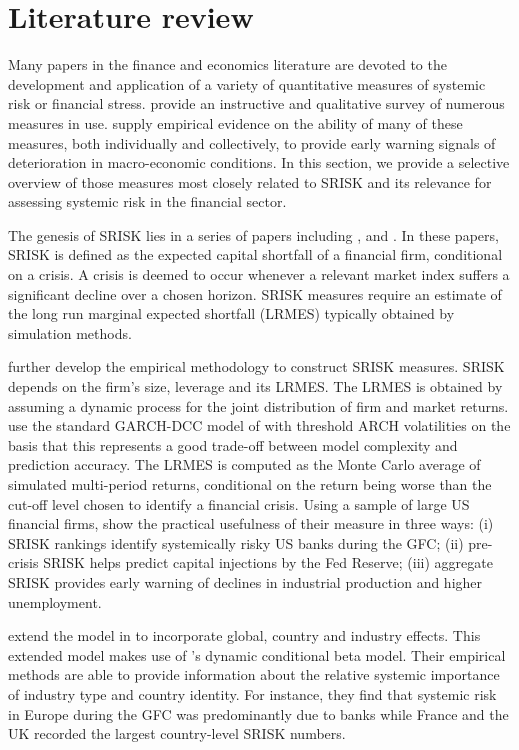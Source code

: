 \documentclass[12pt]{article}
\begin{document}
\section{Literature review}\label{litrev}
Many papers in the finance and economics literature are devoted to the development and application of a variety of quantitative measures of systemic risk or financial stress. \cite{Bisias2012} provide an instructive and qualitative survey of numerous measures in use. \cite{Giglio2015} supply empirical evidence on the ability of many of these measures, both individually and collectively, to provide early warning signals of deterioration in macro-economic conditions. In this section, we provide a selective overview of those measures most closely related to SRISK and its relevance for assessing systemic risk in the financial sector. 

The genesis of SRISK lies in a series of papers including \cite{acharya2012aer}, \cite{acharya2012wp} and \cite{brownlees2010volatility}. In these papers, SRISK is defined as the expected capital shortfall of a financial firm, conditional on a crisis. A crisis is deemed to occur whenever a relevant market index suffers a significant decline over a chosen horizon. SRISK measures require an estimate of the long run marginal expected shortfall (LRMES) typically obtained by simulation methods.

\cite{brownlees2015} further develop the empirical methodology to construct SRISK measures. SRISK depends on the firm's size, leverage and its LRMES. The LRMES is obtained by assuming a dynamic process for the joint distribution of firm and market returns. \cite{brownlees2015} use  the standard GARCH-DCC model of \cite{engle2002dynamic} with threshold ARCH volatilities on the basis that this represents a good trade-off between model complexity and prediction accuracy. The LRMES is computed as the Monte Carlo average of simulated multi-period returns,  conditional on the return being worse than the cut-off level chosen to identify a financial crisis. Using a sample of large US financial firms,  \cite{brownlees2015} show the practical usefulness of their measure in three ways: (i) SRISK rankings identify systemically risky US banks during the GFC; (ii) pre-crisis SRISK helps predict capital injections by the Fed Reserve; (iii) aggregate SRISK provides early warning of declines in industrial production and higher unemployment.
     
\cite{Engle2015} extend the model in \cite{brownlees2015} to incorporate global, country and industry effects. This extended model makes  use of \cite{Engle2014dcb}'s dynamic conditional beta model. Their empirical methods are able to provide information about the relative systemic importance of industry type and country identity. For instance, they find  that systemic risk in Europe during the GFC was predominantly due to banks while France and the UK recorded the largest country-level SRISK numbers. 
\end{document}
